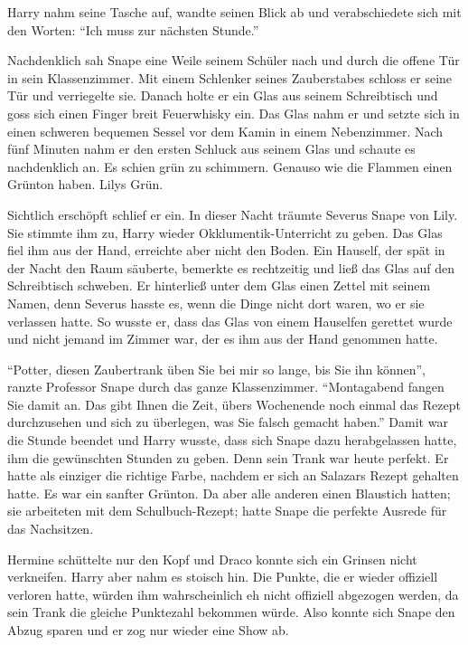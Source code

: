 Harry nahm seine Tasche auf, wandte seinen Blick ab und verabschiedete sich mit den Worten: \enquote{Ich muss zur nächsten Stunde.}

Nachdenklich sah Snape eine Weile seinem Schüler nach und durch die offene Tür in sein Klassenzimmer. Mit einem Schlenker seines Zauberstabes schloss er seine Tür und verriegelte sie. Danach holte er ein Glas aus seinem Schreibtisch und goss sich einen Finger breit Feuerwhisky ein. Das Glas nahm er und setzte sich in einen schweren bequemen Sessel vor dem Kamin in einem Nebenzimmer. Nach fünf Minuten nahm er den ersten Schluck aus seinem Glas und schaute es nachdenklich an. Es schien grün zu schimmern. Genauso wie die Flammen einen Grünton haben. Lilys Grün.

Sichtlich erschöpft schlief er ein. In dieser Nacht träumte Severus Snape von Lily. Sie stimmte ihm zu, Harry wieder Okklumentik-Unterricht zu geben. Das Glas fiel ihm aus der Hand, erreichte aber nicht den Boden. Ein Hauself, der spät in der Nacht den Raum säuberte, bemerkte es rechtzeitig und ließ das Glas auf den Schreibtisch schweben. Er hinterließ unter dem Glas einen Zettel mit seinem Namen, denn Severus hasste es, wenn die Dinge nicht dort waren, wo er sie verlassen hatte. So wusste er, dass das Glas von einem Hauselfen gerettet wurde und nicht jemand im Zimmer war, der es ihm aus der Hand genommen hatte.

\enquote{Potter, diesen Zaubertrank üben Sie bei mir so lange, bis Sie ihn können}, ranzte Professor Snape durch das ganze Klassenzimmer. \enquote{Montagabend fangen Sie damit an. Das gibt Ihnen die Zeit, übers Wochenende noch einmal das Rezept durchzusehen und sich zu überlegen, was Sie falsch gemacht haben.} Damit war die Stunde beendet und Harry wusste, dass sich Snape dazu herabgelassen hatte, ihm die gewünschten Stunden zu geben. Denn sein Trank war heute perfekt. Er hatte als einziger die richtige Farbe, nachdem er sich an Salazars Rezept gehalten hatte. Es war ein sanfter Grünton. Da aber alle anderen einen Blaustich hatten; sie arbeiteten mit dem Schulbuch-Rezept; hatte Snape die perfekte Ausrede für das Nachsitzen.

Hermine schüttelte nur den Kopf und Draco konnte sich ein Grinsen nicht verkneifen. Harry aber nahm es stoisch hin. Die Punkte, die er wieder offiziell verloren hatte, würden ihm wahrscheinlich eh nicht offiziell abgezogen werden, da sein Trank die gleiche Punktezahl bekommen würde. Also konnte sich Snape den Abzug sparen und er zog nur wieder eine Show ab.

